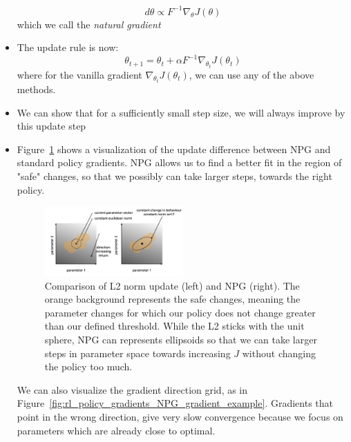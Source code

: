 \begin{itemize}
	$$d\theta  \propto F^{-1}\nabla_{\theta}J(\theta)$$
	which we call the \textit{natural gradient}
	\item The update rule is now:
	$$\theta_{t+1} = \theta_t + \alpha F^{-1}\nabla_{\theta_t}J(\theta_t)$$
	where for the vanilla gradient $\nabla_{\theta_t}J(\theta_t)$, we can use any of the above methods.
	\item We can show that for a sufficiently small step size, we will always improve by this update step 
	\item Figure~\ref{fig:rl_policy_gradients_NPG} shows a visualization of the update difference between NPG and standard policy gradients. NPG allows us to find a better fit in the region of "safe" changes, so that we possibly can take larger steps, towards the right policy.
	
	\begin{figure}[ht!]
		\centering
		\includegraphics[width=0.5\textwidth]{figures/rl_policy_gradients_NPG.png}
		\caption{Comparison of L2 norm update (left) and NPG (right). The orange background represents the safe changes, meaning the parameter changes for which our policy does not change greater than our defined threshold. While the L2 sticks with the unit sphere, NPG can represents ellipsoids so that we can take larger steps in parameter space towards increasing $J$ without changing the policy too much.}
		\label{fig:rl_policy_gradients_NPG}
	\end{figure}

	We can also visualize the gradient direction grid, as in Figure~\ref{fig:rl_policy_gradients_NPG_gradient_example}. Gradients that point in the wrong direction, give very slow convergence because we focus on parameters which are already close to optimal. 
	

\end{itemize}

